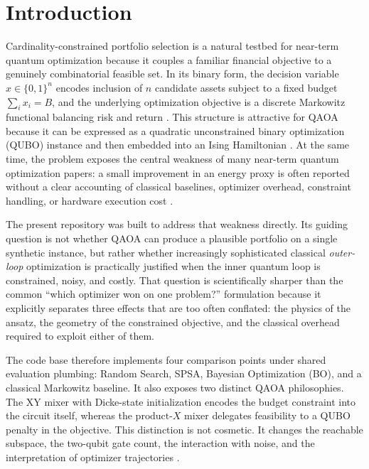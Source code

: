 \documentclass[11pt]{article}
\begin{document}
\section{Introduction}

Cardinality-constrained portfolio selection is a natural testbed for near-term quantum optimization because it couples a familiar financial objective to a genuinely combinatorial feasible set. In its binary form, the decision variable \(x \in \{0,1\}^n\) encodes inclusion of \(n\) candidate assets subject to a fixed budget \(\sum_i x_i = B\), and the underlying optimization objective is a discrete Markowitz functional balancing risk and return \cite{markowitz1952portfolio,kochenberger2014qubo,lucas2014ising}. This structure is attractive for QAOA because it can be expressed as a quadratic unconstrained binary optimization (QUBO) instance and then embedded into an Ising Hamiltonian \cite{farhi2014qaoa,hadfield2019qaoa}. At the same time, the problem exposes the central weakness of many near-term quantum optimization papers: a small improvement in an energy proxy is often reported without a clear accounting of classical baselines, optimizer overhead, constraint handling, or hardware execution cost \cite{cerezo2021vqa,proctor2025benchmarking,nation2025benchpress}.

The present repository was built to address that weakness directly. Its guiding question is not whether QAOA can produce a plausible portfolio on a single synthetic instance, but rather whether increasingly sophisticated classical \emph{outer-loop} optimization is practically justified when the inner quantum loop is constrained, noisy, and costly. That question is scientifically sharper than the common ``which optimizer won on one problem?'' formulation because it explicitly separates three effects that are too often conflated: the physics of the ansatz, the geometry of the constrained objective, and the classical overhead required to exploit either of them.

The code base therefore implements four comparison points under shared evaluation plumbing: Random Search, SPSA, Bayesian Optimization (BO), and a classical Markowitz baseline. It also exposes two distinct QAOA philosophies. The \(\mathrm{XY}\) mixer with Dicke-state initialization encodes the budget constraint into the circuit itself, whereas the \(\mathrm{product}\text{-}X\) mixer delegates feasibility to a QUBO penalty in the objective. This distinction is not cosmetic. It changes the reachable subspace, the two-qubit gate count, the interaction with noise, and the interpretation of optimizer trajectories \cite{hadfield2019qaoa,fuchs2022constrainedmixers,he2023alignment,kordonowy2026lie}.
\end{document}
